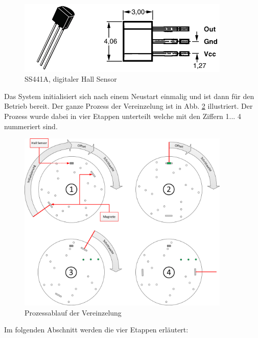 \begin{figure}[H]
	\includegraphics[width=0.9\textwidth]{Illustrationen/6-Umsetzung/Hall_Sensor.png}
	\caption{SS441A, digitaler Hall Sensor \protect\cite{SS441A}}
	\label{fig:SS441A}
\end{figure}

Das System initialisiert sich nach einem Neustart einmalig und ist dann für den Betrieb bereit. Der ganze Prozess der Vereinzelung ist in Abb. \ref{fig:Ansteuerung_Vereinzelung} illustriert.  Der Prozess wurde dabei in vier Etappen unterteilt welche mit den Ziffern 1... 4 nummeriert sind.

\begin{figure}[H]
	\includegraphics[width=0.9\textwidth]{Illustrationen/6-Umsetzung/Prozessablauf_Vereinzelung.png}
	\caption{Prozessablauf der Vereinzelung}
	\label{fig:Ansteuerung_Vereinzelung}
\end{figure}

Im folgenden Abschnitt werden die vier Etappen erläutert:

